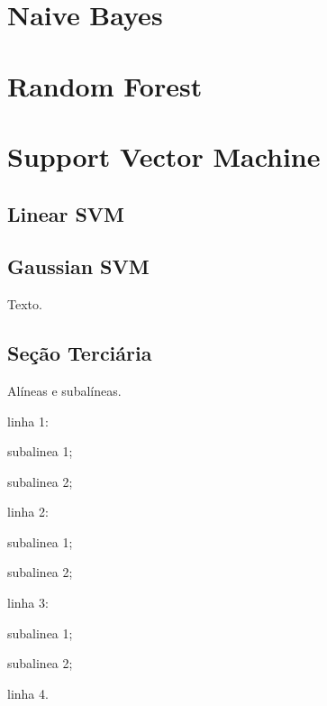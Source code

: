 \section{Naive Bayes}

\section{Random Forest}

\section{Support Vector Machine}

\subsection{Linear SVM}

\subsection{Gaussian SVM}






Texto.

\subsection{Seção Terciária}

Alíneas e subalíneas.
\bigskip

\begin{alineas}
\item linha 1:
\begin{alineas}
\item subalinea 1;
\item subalinea 2;
\end{alineas}
\item linha 2:
\begin{subalineas}
\item subalinea 1;
\item subalinea 2;
\end{subalineas}
\item linha 3:
\begin{incisos}
\item subalinea 1;
\item subalinea 2;
\end{incisos}
\item linha 4.
\end{alineas}


